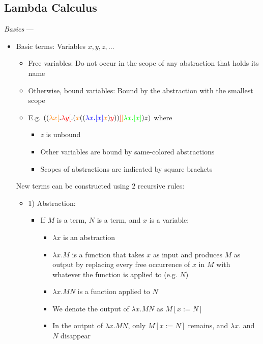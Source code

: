 \subsection*{Lambda Calculus}
\emph{Basics} ---
\begin{itemize}
    \item Basic terms: Variables $x, y, z, \dots$
    \begin{itemize}
        \item Free variables: Do not occur in the scope of any abstraction that holds its name
        \item Otherwise, bound variables: Bound by the abstraction with the smallest scope
        \item E.g. $((\textcolor{orange}{\lambda x[}.\textcolor{red}{\lambda y[}.(\textcolor{orange}{x} ((\textcolor{blue}{\lambda x.[x]} \textcolor{orange}{x}) \textcolor{red}{y}))\textcolor{red}{]}\textcolor{orange}{]} \textcolor{green}{\lambda x.[x]}) z)$ where
        \begin{itemize}
            \item $z$ is unbound
            \item Other variables are bound by same-colored abstractions
            \item Scopes of abstractions are indicated by square brackets
        \end{itemize}
    \end{itemize}
    \items New terms can be constructed using $2$ recursive rules:
    \begin{itemize}
        \item 1) Abstraction:
        \begin{itemize}
            \item If $M$ is a term, $N$ is a term, and $x$ is a variable:
            \begin{itemize}
                \item $\lambda x$ is an abstraction
                \item $\lambda x.M$ is a function that takes $x$ as input and produces $M$ as output by replacing every free occurrence of $x$ in $M$ with whatever the function is applied to (e.g. $N$)
                \item $\lambda x.M N$ is a function applied to $N$
                \item We denote the output of $\lambda x.M N$ as $M[x := N]$
                \item In the output of $\lambda x.M N$, only $M[x := N]$ remains, and $\lambda x.$ and $N$ disappear

\end{itemize}
\end{itemize}
\end{itemize}
\end{itemize}
